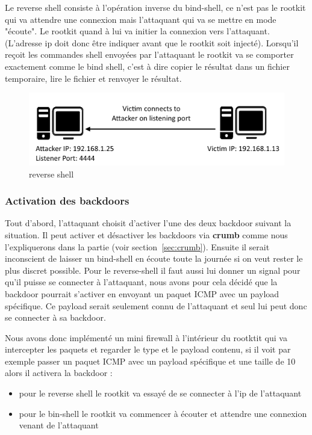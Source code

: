 \documentclass[11pt]{article}
\begin{document}
			Le reverse shell consiste à l'opération inverse du bind-shell, ce n'est pas le rootkit qui va attendre une connexion mais l'attaquant qui va se mettre en mode "écoute". Le rootkit quand à lui va initier la connexion vers l'attaquant. (L'adresse ip doit donc être indiquer avant que le rootkit soit injecté). Lorsqu'il reçoit les commandes shell envoyées par l'attaquant le rootkit va se comporter exactement comme le bind shell, c'est à dire copier le résultat dans un fichier temporaire, lire le fichier et renvoyer le résultat.
			
\begin{figure}[ht!]	
\begin{center}
\includegraphics{./img/reverse-shell.png}

\caption[dsfsdf]{reverse shell}
\end{center}
\end{figure}
			
		\subsubsection{Activation des backdoors}
			
Tout d'abord, l'attaquant choisit d'activer l'une des deux backdoor suivant la situation. Il peut activer et désactiver les backdoors via \textbf{crumb} comme nous l'expliquerons dans la partie (voir section~\ref{sec:crumb}). 
Ensuite il serait inconscient de laisser un bind-shell en écoute toute la journée si on veut rester le plus discret possible. Pour le reverse-shell il faut aussi lui donner un signal pour qu'il puisse se connecter à l'attaquant, nous avons pour cela décidé que la backdoor pourrait s'activer en envoyant un paquet ICMP avec un payload spécifique. Ce payload serait seulement connu de l'attaquant et seul lui peut donc se connecter à sa backdoor.

Nous avons donc implémenté un mini firewall à l'intérieur du rootktit qui va intercepter les paquets et regarder le type et le payload contenu, si il voit par exemple passer un paquet ICMP avec un payload spécifique et une taille de 10 alors il activera la backdoor :
\begin{itemize}
 \item pour le reverse shell le rootkit va essayé de se connecter à l'ip de l'attaquant
 \item pour le bin-shell le rootkit va commencer à écouter et attendre une connexion venant de l'attaquant
\end{itemize}
\end{document}
